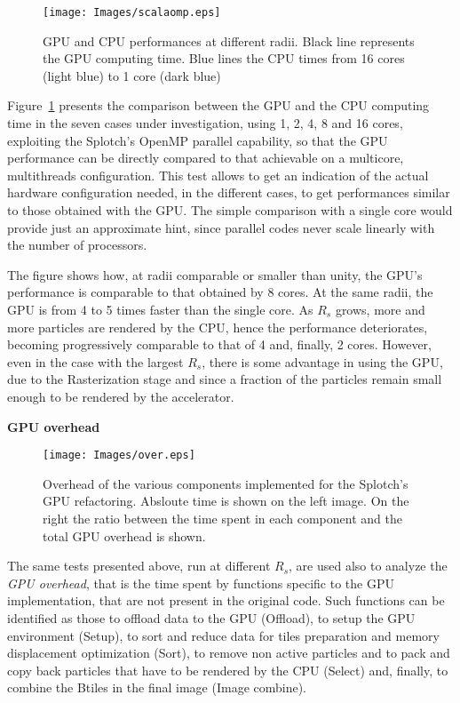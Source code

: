 \documentclass[11pt]{article}
\begin{document}
\begin{figure}
\centering
\texttt{[image: Images/scalaomp.eps]}
\caption{GPU and CPU performances at different radii. Black line represents the GPU 
computing time. Blue lines the CPU times from 16 cores (light blue) to 1 core
(dark blue)}
\label{fig:gpucpu}
\end{figure}

Figure~\ref{fig:gpucpu} presents the comparison between the GPU and the CPU computing time
in the seven cases under investigation, using 
1, 2, 4, 8 and 16 cores, exploiting the Splotch's OpenMP \cite{openmpurl} parallel
capability, so that the GPU performance can be directly compared to
that achievable on a multicore, multithreads configuration.
This test allows to get an indication of the actual hardware configuration
needed, in the different cases, to get performances similar to those
obtained with the GPU. The simple comparison with a single core would provide 
just an approximate hint, since parallel codes never scale linearly with
the number of processors. 

The figure shows how, at radii comparable 
or smaller than unity, the GPU's performance is 
comparable to that obtained by 8 cores.
At the same radii, the GPU is from 4 to 5 times faster than the single 
core. As $R_s$ grows, more and more particles are rendered by the CPU, hence 
the performance deteriorates, becoming progressively comparable to that
of 4 and, finally, 2 cores. However, even in
the case with the largest $R_s$, there is some advantage in using the GPU, 
due to the Rasterization stage and since a fraction of the particles 
remain small enough to be rendered by the accelerator.

{\bf GPU overhead}

\begin{figure}
\centering
\texttt{[image: Images/over.eps]}
\caption{Overhead of the various components implemented for the Splotch's
GPU refactoring. Absloute time is shown on the left image. On the right
the ratio between the time spent in each component and the total GPU 
overhead is shown.}
\label{fig:over}
\end{figure}

The same tests presented above, run at different $R_s$, are used also to
analyze the {\it GPU overhead}, that is the time spent by functions specific
to the GPU implementation, that are not present in the original code. Such functions can 
be identified as those to offload data to the GPU (Offload),
to setup the GPU environment (Setup),
to sort and reduce data for tiles preparation and memory displacement optimization (Sort),
to remove non active particles and to pack and copy back particles that have to 
be rendered by the CPU (Select) and, finally,
to combine the Btiles in the final image (Image combine).   
\end{document}
